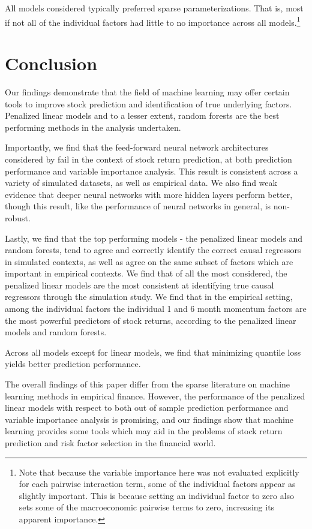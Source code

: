 \documentclass[11pt, a4paper, table]{article}
\begin{document}

All models considered typically preferred sparse parameterizations. That is, most if not all of the individual factors had little to no importance across all models.\footnote{Note that because the variable importance here was not evaluated explicitly for each pairwise interaction term, some of the individual factors appear as slightly important. This is because setting an individual factor to zero also sets some of the macroeconomic pairwise terms to zero, increasing its apparent importance.}

\newpage

\section{Conclusion}

Our findings demonstrate that the field of machine learning may offer certain tools to improve stock prediction and identification of true underlying factors. Penalized linear models and to a lesser extent, random forests are the best performing methods in the analysis undertaken.

Importantly, we find that the feed-forward neural network architectures considered by \cite{gu_empirical_2018} fail in the context of stock return prediction, at both prediction performance and variable importance analysis. This result is consistent across a variety of simulated datasets, as well as empirical data. We also find weak evidence that deeper neural networks with more hidden layers perform better, though this result, like the performance of neural networks in general, is non-robust.

Lastly, we find that the top performing models - the penalized linear models and random forests, tend to agree and correctly identify the correct causal regressors in simulated contexts, as well as agree on the same subset of factors which are important in empirical contexts. We find that of all the most considered, the penalized linear models are the most consistent at identifying true causal regressors through the simulation study. We find that in the empirical setting, among the individual factors the individual 1 and 6 month momentum factors are the most powerful predictors of stock returns, according to the penalized linear models and random forests. 

Across all models except for linear models, we find that minimizing quantile loss yields better prediction performance.

The overall findings of this paper differ from the sparse literature on machine learning methods in empirical finance. However, the performance of the penalized linear models with respect to both out of sample prediction performance and variable importance analysis is promising, and our findings show that machine learning provides some tools which may aid in the problems of stock return prediction and risk factor selection in the financial world. 
\end{document}
